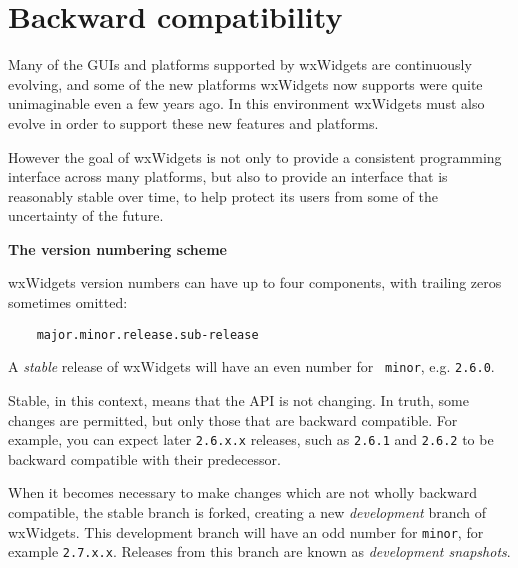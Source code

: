
\chapter{Backward compatibility}\label{backwardcompatibility}
%
\setfooter{\thepage}{}{}{}{}{\thepage}%

Many of the GUIs and platforms supported by wxWidgets are continuously
evolving, and some of the new platforms wxWidgets now supports were quite
unimaginable even a few years ago. In this environment wxWidgets must also
evolve in order to support these new features and platforms.

However the goal of wxWidgets is not only to provide a consistent
programming interface across many platforms, but also to provide an
interface that is reasonably stable over time, to help protect its users
from some of the uncertainty of the future.

{\large {\bf The version numbering scheme}}\label{versionnumbering}

wxWidgets version numbers can have up to four components, with trailing
zeros sometimes omitted:

\begin{verbatim}
    major.minor.release.sub-release
\end{verbatim}

A {\em stable} release of wxWidgets will have an even number for {\tt
minor}, e.g. {\tt 2.6.0}.

Stable, in this context, means that the API is not changing. In truth, some
changes are permitted, but only those that are backward compatible. For
example, you can expect later {\tt 2.6.x.x} releases, such as {\tt 2.6.1}
and {\tt 2.6.2} to be backward compatible with their predecessor.

When it becomes necessary to make changes which are not wholly backward
compatible, the stable branch is forked, creating a new {\em development}
branch of wxWidgets. This development branch will have an odd number
for {\tt minor}, for example {\tt 2.7.x.x}. Releases from this branch are
known as {\em development snapshots}.

